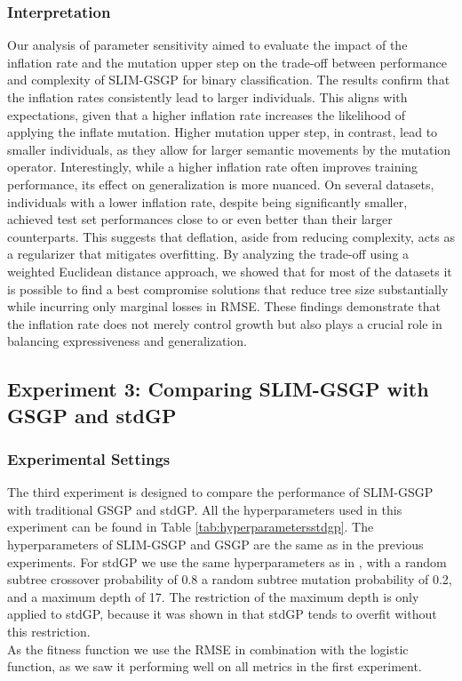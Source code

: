 \documentclass[manuscript, review, anonymous]{acmart} %
\begin{document}
\subsubsection{Interpretation}
Our analysis of parameter sensitivity aimed to evaluate the impact of the inflation rate and the mutation upper step on the 
trade-off between performance and complexity of SLIM-GSGP for binary classification. 
The results confirm that the inflation rates consistently lead to larger individuals.
This aligns with expectations, given that a higher inflation rate increases 
the likelihood of applying the inflate mutation.
Higher mutation upper step, in contrast, lead to smaller individuals, 
as they allow for larger semantic movements by the mutation operator.
Interestingly, while a higher inflation rate often improves training performance, 
its effect on generalization is more nuanced. On several datasets, 
individuals with a lower inflation rate, despite being 
significantly smaller, achieved test set performances close to or even better than their larger counterparts. 
This suggests that deflation, aside from reducing complexity, acts as a regularizer that mitigates overfitting.
By analyzing the trade-off using a weighted Euclidean distance approach, 
we showed that for most of the datasets it is possible to find a 
best compromise solutions that reduce tree size substantially while incurring only marginal losses in RMSE. 
These findings demonstrate that the inflation rate does not merely control growth but also plays 
a crucial role in balancing expressiveness and generalization.
\subsection{Experiment 3: Comparing SLIM-GSGP with GSGP and stdGP}
\label{sec:exp3}
\subsubsection{Experimental Settings}
The third experiment is designed to compare the performance of
SLIM-GSGP with traditional GSGP and stdGP.
All the hyperparameters used in this experiment can be found
in Table \ref{tab:hyperparametersstdgp}.
The hyperparameters of SLIM-GSGP and GSGP are the same as
in the previous experiments.
For stdGP we use the same hyperparameters as in \cite{Vanneschi2024},
with a random subtree crossover probability of 0.8
a random subtree mutation probability of 0.2, and a maximum depth of
17. The restriction of the maximum depth is only applied
to stdGP,
because it was shown in \cite{Vanneschi2014} that stdGP tends to overfit without this restriction.\\
As the fitness function we use the RMSE in combination
with the logistic function, as we saw it performing well on all metrics in the first experiment.

\end{document}
